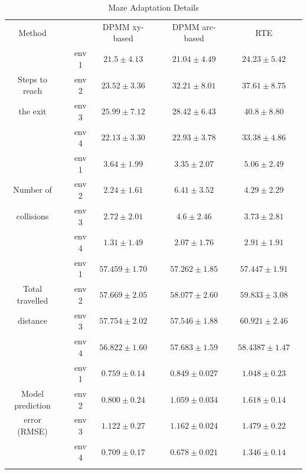 \begin{table}[t!]
\caption{Maze Adaptation Details}
\centering
\begin{tabular}{c c c c c c c c c}
\hline
\addlinespace[0.1cm]
Method         & &       & DPMM xy-based & & DPMM arc-based & & RTE   & \\
\addlinespace[0.1cm]
\hline
\addlinespace[0.1cm]
               & & env 1 & $21.5 \pm 4.13$ & & $21.04 \pm 4.49$ & & $24.23 \pm 5.42$ & \\
Steps to reach & & env 2 & $23.52 \pm 3.36$ & & $\bm{32.21 \pm 8.01}$ & & $37.61 \pm 8.75$ & \\
 the exit & & env 3 & $25.99 \pm 7.12$ & & $28.42 \pm 6.43$ & & $40.8 \pm 8.80$ & \\
               & & env 4 & $22.13 \pm 3.30$ & &  $22.93 \pm 3.78$ & & $33.38 \pm 4.86$   & \\
\addlinespace[0.1cm]
\hline
%
%
\addlinespace[0.1cm]
               & & env 1 & $3.64 \pm 1.99$ & & $3.35 \pm 2.07$ & & $5.06 \pm 2.49$ & \\
Number of      & & env 2 & $2.24 \pm 1.61$ & & $\bm{6.41 \pm 3.52}$ & & $\bm{4.29 \pm 2.29}$ & \\
collisions     & & env 3 & $2.72 \pm 2.01$ & & $4.6 \pm 2.46$ & & $3.73 \pm 2.81$ & \\
               & & env 4 & $1.31 \pm 1.49$ & & $2.07 \pm 1.76$ & & $2.91 \pm 1.91$   & \\
\addlinespace[0.1cm]
\hline
%
%
\addlinespace[0.1cm]
               & & env 1 & $57.459 \pm 1.70$ & & $57.262 \pm 1.85$ & & $57.447 \pm 1.91$ & \\
Total travelled& & env 2 & $57.669 \pm 2.05$ & & $58.077 \pm 2.60$ & & $\bm{59.833 \pm 3.08}$ & \\
distance       & & env 3 & $57.754 \pm 2.02$ & & $57.546 \pm 1.88$ & & $\bm{60.921 \pm 2.46}$ & \\
               & & env 4 & $56.822 \pm 1.60$ & & $ 57.683 \pm 1.59 $ & &  $\bm{58.4387 \pm 1.47}$ & \\
\addlinespace[0.1cm]
\hline
%
%
\addlinespace[0.1cm]
               & & env 1 & $0.759 \pm 0.14$  & & $0.849 \pm 0.027$ & & $1.048 \pm 0.23$ & \\
Model prediction&& env 2 & $\bm{0.800 \pm 0.24}$ & & $\bm{1.059 \pm 0.034}$ & & $\bm{1.618 \pm 0.14}$ & \\
error (RMSE)   & & env 3 & $1.122 \pm 0.27$  & & $1.162 \pm 0.024$ & & $1.479 \pm 0.22$ & \\
               & & env 4 & $0.709 \pm 0.17$ & & $0.678 \pm 0.021$ & & $1.346 \pm 0.14$ & \\
\addlinespace[0.1cm]
\hline
\end{tabular}
\label{detailed_data}
\end{table}

